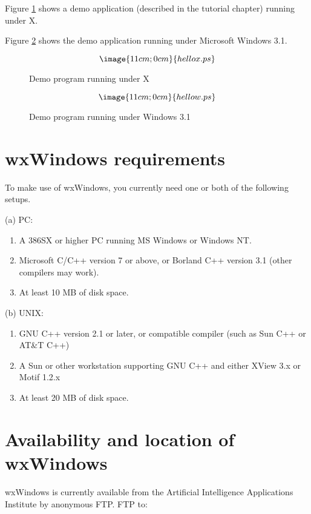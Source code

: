 Figure \ref{demo-x} shows a demo application (described in the tutorial chapter)
running under X.

Figure \ref{demo-ms} shows the demo application running under Microsoft Windows 3.1.

\begin{figure}
$$\image{11cm;0cm}{hellox.ps}$$
\caption{Demo program running under X}\label{demo-x}
\end{figure}

\begin{figure}
$$\image{11cm;0cm}{hellow.ps}$$
\caption{Demo program running under Windows 3.1}\label{demo-ms}
\end{figure}

\section{wxWindows requirements}\label{requirements}

To make use of wxWindows, you currently need one or both of the
following setups.

(a) PC:

\begin{enumerate}\itemsep=0pt
\item A 386SX or higher PC running MS Windows or Windows NT.
\item Microsoft C/C++ version 7 or above, or Borland C++
version 3.1 (other compilers may work).
\item At least 10 MB of disk space.
\end{enumerate}

(b) UNIX:

\begin{enumerate}\itemsep=0pt
\item GNU C++ version 2.1 or later, or compatible compiler (such as
Sun C++ or AT\&T C++)
\item A Sun or other workstation supporting GNU C++ and either XView 3.x
or Motif 1.2.x
\item At least 20 MB of disk space.
\end{enumerate}

\section{Availability and location of wxWindows}

wxWindows is currently available from the Artificial Intelligence
Applications Institute by anonymous FTP. FTP to:

